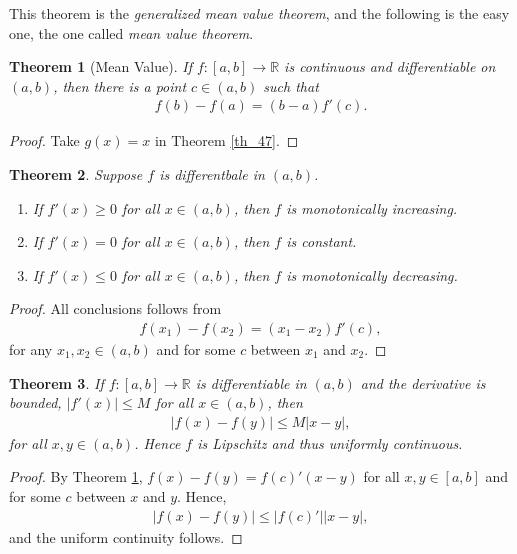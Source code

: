 \documentclass[10pt]{book}
\newtheorem{theorem}{Theorem}[chapter]
\theoremstyle{definition}
\numberwithin{equation}{chapter}
\begin{document}
\medskip

This theorem is the {\em generalized mean value theorem}, and the following is the easy one, the one called {\em mean value theorem}.

\medskip

\begin{theorem}[Mean Value]\label{th_48}
If $f: [a,b] \to \mathbb{R}$ is continuous and differentiable on $(a,b)$, then there is a point $c \in (a,b)$ such that
\begin{align*}
    f(b) - f(a) = (b - a) f'(c).
\end{align*}
\end{theorem}
\begin{proof}
Take $g(x) = x$ in Theorem \ref{th_47}.
\end{proof}

\medskip

\begin{theorem}
Suppose $f$ is differentbale in $(a,b)$.
\begin{enumerate}[label=(\alph*)]
    \item If $f'(x) \geq 0$ for all $x \in (a,b)$, then $f$ is monotonically increasing.
    
    \item If $f'(x) = 0$ for all $x \in (a,b)$, then $f$ is constant.
    
    \item If $f'(x) \leq 0$ for all $x \in (a,b)$, then $f$ is monotonically decreasing.
\end{enumerate}
\end{theorem}
\begin{proof}
All conclusions follows from
\begin{align*}
    f(x_1) - f(x_2) = (x_1 - x_2) f'(c),
\end{align*}
for any $x_1, x_2 \in (a,b)$ and for some $c$ between $x_1$ and $x_2$.
\end{proof}

\medskip

\begin{theorem}
If $f: [a,b] \to \mathbb{R}$ is differentiable in $(a,b)$ and the derivative is bounded, $\left|f'(x)\right| \leq M$ for all $x \in (a,b)$, then 
\begin{align*}
    \left|f(x) - f(y)\right| \leq M \left|x - y\right|,
\end{align*}
for all $x,y \in (a,b)$. Hence $f$ is Lipschitz and thus uniformly continuous.
\end{theorem}
\begin{proof}
By Theorem \ref{th_48}, $f(x) - f(y) = f(c)'(x - y)$ for all $x,y \in [a,b]$ and for some $c$ between $x$ and $y$. Hence,
\begin{align*}
    \left|f(x) - f(y)\right| \leq \left|f(c)'\right| \left|x - y\right|,
\end{align*}
and the uniform continuity follows.
\end{proof}
\end{document}
